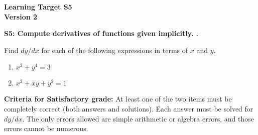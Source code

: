 \documentclass[10pt]{article}
\begin{document}
	\vspace*{0in}

		\begin{center}
			\textbf{Learning Target S5 \\
			Version 2} 
		\end{center}


\begin{framed}
	\textbf{S5: Compute derivatives of functions given implicitly.
.}
\end{framed}

Find $dy/dx$ for each of the following expressions in terms of $x$ and $y$. 

\begin{enumerate}
    \item $x^2 + y^4 = 3$
    \item $x^2 + xy + y^2 = 1$
\end{enumerate}

\vfill


\begin{small}
    \begin{framed}
        	\textbf{Criteria for Satisfactory grade:} At least one of the two items must be completely correct (both answers and solutions). Each answer must be solved for $dy/dx$. The only errors allowed are simple arithmetic or algebra errors, and those errors cannot be numerous.
    \end{framed}

\end{small}
\end{document}
